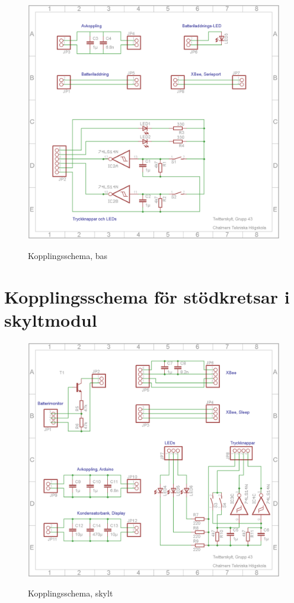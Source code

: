 \documentclass[a4paper,11pt]{article}
\begin{document}
\begin{figure}[H]
\includegraphics[scale=0.8, angle=0]{sch_bas.png}
\label{fig:base_schematic}
\caption{Kopplingsschema, bas}
\end{figure}
\pagebreak

\section{Kopplingsschema för stödkretsar i skyltmodul}

\begin{figure}[H]
\includegraphics[scale=0.8, angle=0]{sch_skylt.png}
\label{fig:skylt_schematic}
\caption{Kopplingsschema, skylt}
\end{figure}
\pagebreak
\end{document}

